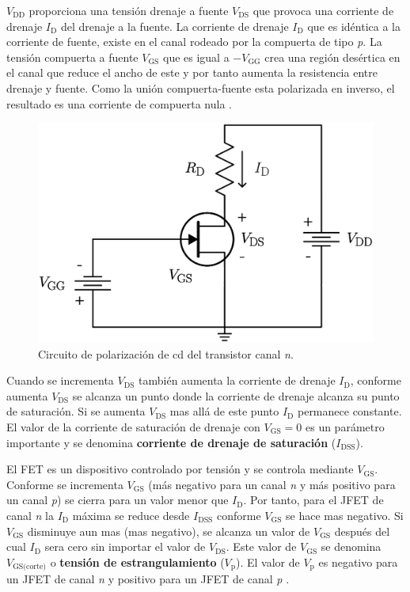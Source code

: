$V_{\text{DD}}$ proporciona una tensión drenaje a fuente $V_{\text{DS}}$ que
provoca una corriente de drenaje $I_{\text{D}}$ del drenaje a la fuente. La
corriente de drenaje $I_{\text{D}}$ que es idéntica a la corriente de fuente,
existe en el canal rodeado por la compuerta de tipo \emph{p}. La tensión
compuerta a fuente $V_{\text{GS}}$ que es igual a $-V_{\text{GG}}$ crea una
región desértica en el canal que reduce el ancho de este y por tanto aumenta la
resistencia entre drenaje y fuente. Como la unión compuerta-fuente esta
polarizada en inverso, el resultado es una corriente de compuerta nula
\cite{Savant}.

\begin{figure}[!ht]
\centering
\includegraphics[scale=0.30]{diagramas/figura07.eps}
\caption{Circuito de polarización de cd del transistor canal \emph{n}.}
\label{figura07}
\end{figure}

Cuando se incrementa $V_{\text{DS}}$ también aumenta la corriente de drenaje
$I_{\text{D}}$, conforme aumenta $V_{\text{DS}}$ se alcanza un punto donde la
corriente de drenaje alcanza su punto de saturación. Si se aumenta
$V_{\text{DS}}$ mas allá de este punto $I_{\text{D}}$ permanece constante. El
valor de la corriente de saturación de drenaje con $V_{\text{GS}} = 0$ es un
parámetro importante y se denomina \textbf{corriente de drenaje de saturación}
($I_{\text{DSS}}$).

El FET es un dispositivo controlado por tensión y se controla mediante
$V_{\text{GS}}$. Conforme se incrementa $V_{\text{GS}}$ (más negativo para un
canal \emph{n} y más positivo para un canal \emph{p}) se cierra para un valor
menor que $I_{\text{D}}$. Por tanto, para el JFET de canal \emph{n} la
$I_{\text{D}}$ máxima se reduce desde $I_{\text{DSS}}$ conforme $V_{\text{GS}}$
se hace mas negativo. Si $V_{\text{GS}}$ disminuye aun mas (mas negativo), se
alcanza un valor de $V_{\text{GS}}$ después del cual $I_{\text{D}}$ sera cero
sin importar el valor de $V_{\text{DS}}$. Este valor de $V_{\text{GS}}$ se
denomina $V_{\text{GS(corte)}}$ o \textbf{tensión de estrangulamiento}
($V_{\text{p}}$). El valor de $V_{\text{p}}$ es negativo para un JFET de canal
\emph{n} y positivo para un JFET de canal \emph{p} \cite{Savant}.

